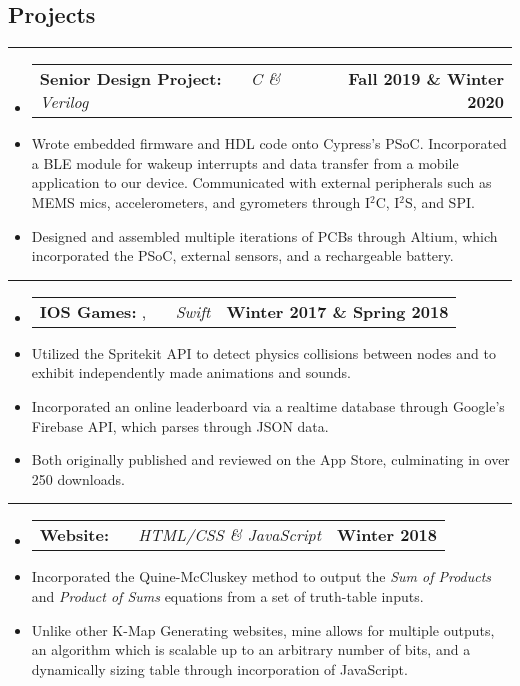 \documentclass[10pt,letterpaper]{article}
\makeatletter
\newcommand{\items}[2]
{
	\begin{tabular*}{\linewidth}{l @{\extracolsep{\fill}} r}
		#1 & #2 \\
	\end{tabular*}
}
\newcommand{\sectionbreak}
{
	\vspace{-1.2em}
	\rule{\textwidth}{1.7pt}
	\vspace{-1.7em}
}
\makeatother
\begin{document}
\vspace{-1.5em}

\subsection*{Projects}
\sectionbreak


\begin{itemize}
	\item[]
		\items 
		{
			\textbf{Senior Design Project: }
			\emph{\smash{Smart Dog Collar}} \ \ \ \footnotesize \emph{C \& Verilog}
		}
			{\textbf{Fall 2019 \& Winter 2020}}
		\item 
			Wrote embedded firmware and HDL code onto Cypress's PSoC. Incorporated a BLE module for wakeup interrupts and data transfer from a mobile application to our device. Communicated with external peripherals such as MEMS mics, accelerometers, and gyrometers through I$^{2}$C, I$^{2}$S, and SPI. 
		\item 
			Designed and assembled multiple iterations of PCBs through Altium, which incorporated the PSoC, external sensors, and a rechargeable battery.

\end{itemize}

\hrule

\begin{itemize}
	\item[]
		\items 
		{
			\textbf{IOS Games: }
			\href{https://appadvice.com/app/round-bound/1369632746}{\emph{\underline{\smash{Round 'a Bound}}}}, 
			\href{https://appadvice.com/app/tic-tac-emoji/1346934986}{\emph{\underline{\smash{Tic-Tac Emoji}}}} \ \ \ \footnotesize  \emph{Swift}
		}
			{\textbf{Winter 2017 \& Spring 2018}}
		\item 
			Utilized the Spritekit API to detect physics collisions between nodes and to exhibit independently made animations and sounds.
		\item
			Incorporated an online leaderboard via a realtime database through Google's Firebase API, which parses through JSON data. 
		\item
			Both originally published and reviewed on the App Store, culminating in over 250 downloads.
\end{itemize}

\hrule

\begin{itemize}
	\item[]
		\items
			{	
				\textbf{Website: }
				\href{https://aashpointo.github.io/KmapWebsite/}{\emph{\underline{\smash{aashpointo.github.io/KmapWebsite}}}} \ \ \ \footnotesize \emph{HTML/CSS \& JavaScript}
				}
				{\textbf{Winter 2018}}
		\item
			Incorporated the Quine-McCluskey method to output the \emph{Sum of Products} and \emph{Product of Sums} equations from a set of truth-table inputs.
		\item 
			Unlike other K-Map Generating websites, mine allows for multiple outputs, an algorithm which is scalable up to an arbitrary number of bits, and a dynamically sizing table through incorporation of JavaScript.

\end{itemize}
\end{document}
